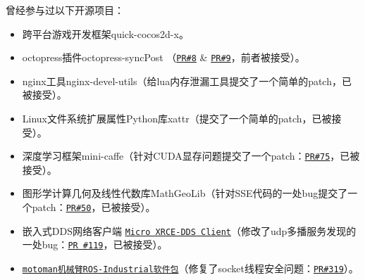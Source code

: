 \documentclass[letterpaper]{article}
\begin{document}
曾经参与过以下开源项目：
\begin{itemize}
  \item 跨平台游戏开发框架quick-cocos2d-x。
  \item octopress插件octopress-syncPost （\href{https://github.com/huangbowen521/octopress-syncPost/pull/8}{\tt PR\#8} \& \href{https://github.com/huangbowen521/octopress-syncPost/pull/9}{\tt PR\#9}，前者被接受）。
  \item nginx工具nginx-devel-utils（给lua内存泄漏工具提交了一个简单的patch，已被接受）。
  \item Linux文件系统扩展属性Python库xattr（提交了一个简单的patch，已被接受）。
  \item 深度学习框架mini-caffe（针对CUDA显存问题提交了一个patch：\href{https://github.com/luoyetx/mini-caffe/pull/75}{\tt PR\#75}，已被接受）。
  \item 图形学计算几何及线性代数库MathGeoLib（针对SSE代码的一处bug提交了一个patch：\href{https://github.com/juj/MathGeoLib/pull/50}{\tt PR\#50}，已被接受）。
  \item 嵌入式DDS网络客户端 \href{https://github.com/eProsima/Micro-XRCE-DDS-Client}{\tt Micro XRCE-DDS Client}（修改了udp多播服务发现的一处bug：\href{https://github.com/eProsima/Micro-XRCE-DDS-Client/pull/119}{\tt PR \#119}，已被接受）。
  \item \href{https://github.com/ros-industrial/motoman}{\tt motoman机械臂ROS-Industrial软件包}（修复了socket线程安全问题：\href{https://github.com/ros-industrial/motoman/pull/319}{\tt PR\#319}）。
\end{itemize}


\end{document}
